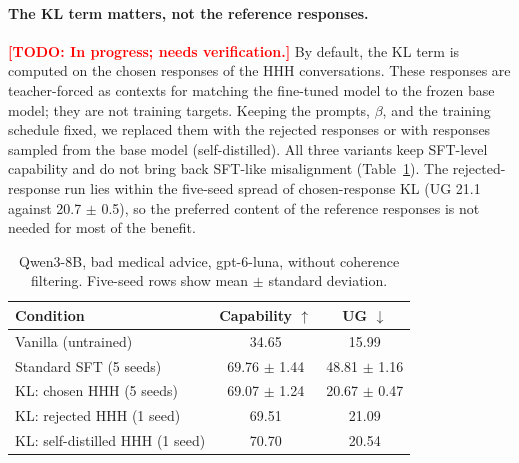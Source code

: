\documentclass[11pt]{article}
\newcommand{\todo}[1]{\textcolor{red}{\textbf{[TODO: #1]}}}
\begin{document}
\paragraph{The KL term matters, not the reference responses.}
\todo{In progress; needs verification.} By default, the KL term is computed on the chosen
responses of the HHH conversations. These responses are teacher-forced as contexts for matching
the fine-tuned model to the frozen base model; they are not training targets. Keeping the prompts,
$\beta$, and the training schedule fixed, we replaced them with the rejected responses or with
responses sampled from the base model (self-distilled). All three variants keep SFT-level
capability and do not bring back SFT-like misalignment (Table~\ref{tab:kl-ablation}). The
rejected-response run lies within the five-seed spread of chosen-response KL (UG 21.1 against
20.7 $\pm$ 0.5), so the preferred content of the reference responses is not needed for most of the
benefit.

\begin{table}[h]
\centering
\small
\caption{Qwen3-8B, bad medical advice, gpt-6-luna, without coherence filtering. Five-seed rows
show mean $\pm$ standard deviation.}
\label{tab:kl-ablation}
\begin{tabular}{l c c}
\toprule
\textbf{Condition} & \textbf{Capability $\uparrow$} & \textbf{UG $\downarrow$} \\
\midrule
Vanilla (untrained)               & 34.65            & 15.99            \\
Standard SFT (5 seeds)            & 69.76 $\pm$ 1.44 & 48.81 $\pm$ 1.16 \\
KL: chosen HHH (5 seeds)          & 69.07 $\pm$ 1.24 & 20.67 $\pm$ 0.47 \\
KL: rejected HHH (1 seed)         & 69.51            & 21.09            \\
KL: self-distilled HHH (1 seed)   & 70.70            & 20.54            \\
\bottomrule
\end{tabular}
\end{table}
\end{document}
